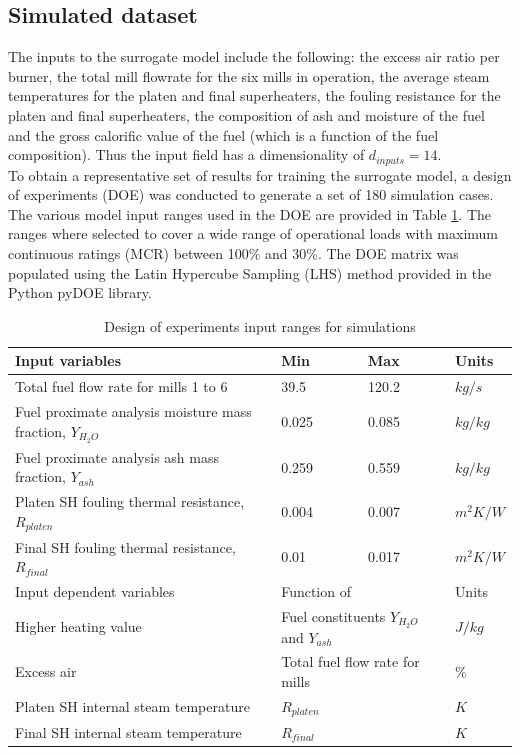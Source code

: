 \documentclass[a4paper,fleqn]{cas-sc}
\begin{document}
\subsection{Simulated dataset}
The inputs to the surrogate model include the following: the excess air ratio per burner, the total mill flowrate for the six mills in operation, the average steam temperatures for the platen and final superheaters, the fouling resistance for the platen and final superheaters, the composition of ash and moisture of the fuel and the gross calorific value of the fuel (which is a function of the fuel composition). Thus the input field has a dimensionality of $d_{inputs}=14$.\\

To obtain a representative set of results for training the surrogate model, a design of experiments (DOE) was conducted to generate a set of 180 simulation cases. The various model input ranges used in the DOE are provided in Table \ref{tbl_doe}. The ranges where selected to cover a wide range of operational loads with maximum continuous ratings (MCR) between 100\% and 30\%. The DOE matrix was populated using the Latin Hypercube Sampling (LHS) method provided in the Python pyDOE library.
\begin{table}[pos =h]
\caption{Design of experiments input ranges for  simulations}\label{tbl_doe}
\begin{tabular*}{\tblwidth}{p{}p{}p{}p{}}
\toprule
 Input variables& Min& Max& Units \\ %
\midrule
 Total fuel flow rate for mills 1 to 6 & 39.5 & 120.2 & $kg/s$ \\
 Fuel proximate analysis moisture mass fraction, $Y_{H_2O}$ & 0.025 & 0.085 & $kg/kg$ \\
 Fuel proximate analysis ash mass fraction, $Y_{ash}$  & 0.259 & 0.559 & $kg/kg$ \\
 Platen SH fouling thermal resistance, $R_{platen}$  & 0.004 & 0.007 & $m^2K/W$ \\
 Final SH fouling thermal resistance, $R_{final}$  &0.01 & 0.017 & $m^2K/W$ \\
\midrule
Input dependent variables& \multicolumn{2}{l}{Function of}& Units\\
\midrule
Higher heating value&\multicolumn{2}{l}{Fuel constituents $Y_{H_2O}$ and $Y_{ash}$}&$J/kg$\\
Excess air & \multicolumn{2}{l}{Total fuel flow rate for mills} & $\%$\\
Platen SH internal steam temperature& \multicolumn{2}{l}{$R_{platen}$} & $K$\\
Final SH internal steam temperature& \multicolumn{2}{l}{$R_{final}$} & $K$\\
\bottomrule
\end{tabular*}
\end{table}
\end{document}
